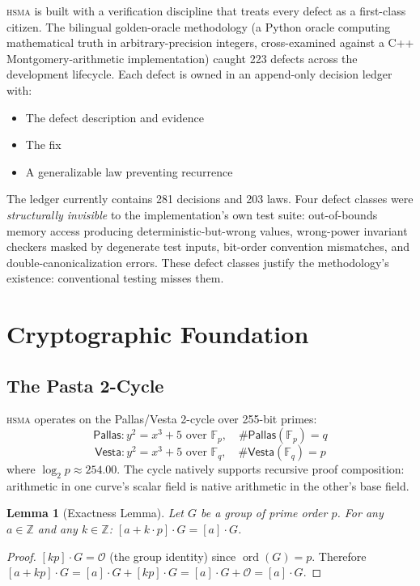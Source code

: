 \documentclass[11pt, a4paper]{article}
\newtheorem{lemma}[theorem]{Lemma}
\newcommand{\hsma}{\textsc{hsma}}
\begin{document}
\hsma{} is built with a verification discipline that treats every defect as a first-class citizen. The bilingual golden-oracle methodology (a Python oracle computing mathematical truth in arbitrary-precision integers, cross-examined against a C++ Montgomery-arithmetic implementation) caught 223 defects across the development lifecycle. Each defect is owned in an append-only decision ledger with:
\begin{itemize}
\item The defect description and evidence
\item The fix
\item A generalizable law preventing recurrence
\end{itemize}

The ledger currently contains 281 decisions and 203 laws. Four defect classes were \emph{structurally invisible} to the implementation's own test suite: out-of-bounds memory access producing deterministic-but-wrong values, wrong-power invariant checkers masked by degenerate test inputs, bit-order convention mismatches, and double-canonicalization errors. These defect classes justify the methodology's existence: conventional testing misses them.

\section{Cryptographic Foundation}

\subsection{The Pasta 2-Cycle}

\hsma{} operates on the Pallas/Vesta 2-cycle over 255-bit primes:
\begin{equation}
\textsf{Pallas}: y^2 = x^3 + 5 \text{ over } \mathbb{F}_p, \quad \#\textsf{Pallas}(\mathbb{F}_p) = q
\end{equation}
\begin{equation}
\textsf{Vesta}: y^2 = x^3 + 5 \text{ over } \mathbb{F}_q, \quad \#\textsf{Vesta}(\mathbb{F}_q) = p
\end{equation}
where $\log_2 p \approx 254.00$. The cycle natively supports recursive proof composition: arithmetic in one curve's scalar field is native arithmetic in the other's base field.

\begin{lemma}[Exactness Lemma]
\label{lem:exactness}
Let $G$ be a group of prime order $p$. For any $a \in \mathbb{Z}$ and any $k \in \mathbb{Z}$: $[a + k \cdot p] \cdot G = [a] \cdot G$.
\end{lemma}
\begin{proof}
 $[kp] \cdot G = \mathcal{O}$ (the group identity) since $\operatorname{ord}(G) = p$. Therefore $[a + kp] \cdot G = [a] \cdot G + [kp] \cdot G = [a] \cdot G + \mathcal{O} = [a] \cdot G$.
\end{proof}
\end{document}
